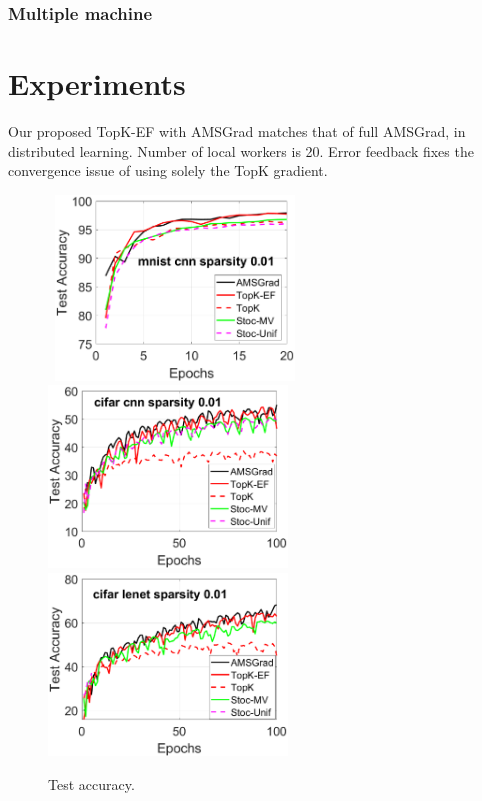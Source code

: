 \documentclass{article}
\begin{document}
\subsubsection{Multiple machine}



\section{Experiments}\label{sec:experiment}
Our proposed TopK-EF with AMSGrad matches that of full AMSGrad, in distributed learning. Number of local workers is 20. Error feedback fixes the convergence issue of using solely the TopK gradient. 

\begin{figure}[h]
    \begin{center}
    \mbox{\hspace{-0.3in}
        \includegraphics[width=2.5in]{figure/mnist_cnn_test_accuracy.eps}
        \includegraphics[width=2.5in]{figure/cifar_cnn_test_accuracy.eps}
        \includegraphics[width=2.5in]{figure/cifar_lenet_test_accuracy.eps}
    }
    \end{center}
    \vspace{-0.1in}
	\caption{Test accuracy.}
	\label{fig:test accuracy}
\end{figure}
\end{document}
